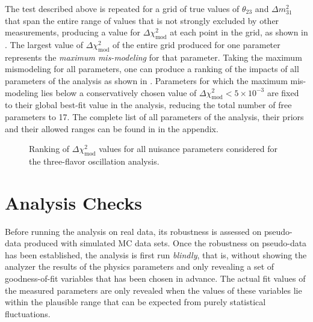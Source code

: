 The test described above is repeated for a grid of true values of $\theta_{23}$ and $\Delta m^2_{31}$ that span the entire range of values that is not strongly excluded by other measurements, producing a value for $\Delta \chi^2_{\mathrm{mod}}$ at each point in the grid, as shown in . The largest value of $\Delta \chi^2_{\mathrm{mod}}$ of the entire grid produced for one parameter represents the \emph{maximum mis-modeling} for that parameter. Taking the maximum mismodeling for all parameters, one can produce a ranking of the impacts of all parameters of the analysis as shown in . Parameters for which the maximum mis-modeling lies below a conservatively chosen value of $\Delta \chi^2_{\mathrm{mod}} < 5\times10^{-3}$ are fixed to their global best-fit value in the analysis, reducing the total number of free parameters to 17. The complete list of all parameters of the analysis, their priors and their allowed ranges can be found in  in the appendix.
\begin{figure}
    \centering
    
    \caption{Ranking of $\Delta \chi^2_{\mathrm{mod}}$ values for all nuisance parameters considered for the three-flavor oscillation analysis.}
    \label{fig:systematic-impact-mismod-ranking}
\end{figure}

\section{Analysis Checks}
Before running the analysis on real data, its robustness is assessed on pseudo-data produced with simulated MC data sets. Once the robustness on pseudo-data has been established, the analysis is first run \emph{blindly}, that is, without showing the analyzer the results of the physics parameters and only revealing a set of goodness-of-fit variables that has been chosen in advance. The actual fit values of the measured parameters are only revealed when the values of these variables lie within the plausible range that can be expected from purely statistical fluctuations.

